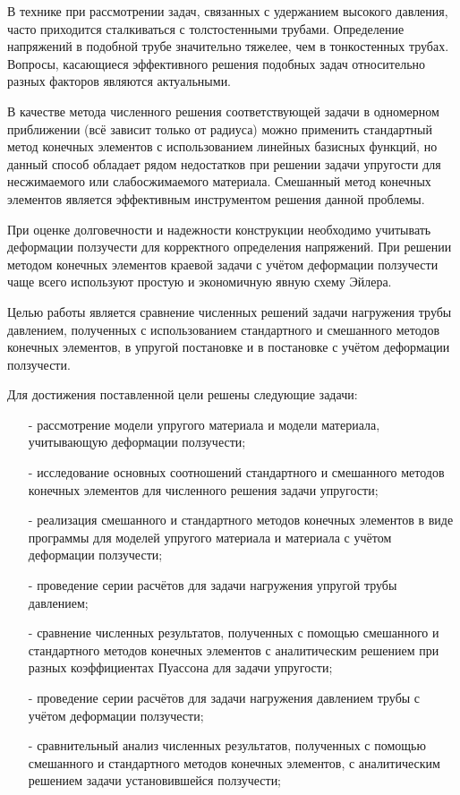 \documentclass[a4paper,14pt]{extarticle}
\begin{document}
В технике при рассмотрении задач, связанных с удержанием высокого давления, часто приходится сталкиваться с толстостенными трубами. Определение напряжений в подобной трубе значительно тяжелее, чем в тонкостенных трубах. Вопросы, касающиеся эффективного решения подобных задач относительно разных факторов являются актуальными. 

В качестве метода численного решения соответствующей задачи в одномерном приближении (всё зависит только от радиуса) можно применить стандартный метод конечных элементов с использованием линейных базисных функций, но данный способ обладает рядом недостатков при решении задачи упругости для несжимаемого или слабосжимаемого материала. Смешанный метод конечных элементов является эффективным инструментом решения данной проблемы. 

При оценке долговечности и надежности конструкции необходимо учитывать деформации ползучести для корректного определения напряжений. При решении методом конечных элементов краевой задачи с учётом деформации ползучести чаще всего используют простую и экономичную явную схему Эйлера.

Целью работы является сравнение численных решений задачи нагружения трубы давлением, полученных с использованием стандартного и смешанного методов конечных элементов, в упругой постановке и в постановке с учётом деформации ползучести.

Для достижения поставленной цели решены следующие задачи:
\begin{itemize}
\item[-]рассмотрение модели упругого материала и модели материала, учитывающую деформации ползучести;
\item[-]исследование основных соотношений стандартного и смешанного методов конечных элементов для численного решения задачи упругости;
\item[-]реализация смешанного и стандартного методов конечных элементов в виде программы для моделей упругого материала и материала с учётом деформации ползучести;
\item[-]проведение серии расчётов для задачи нагружения упругой трубы давлением;
\item[-]сравнение численных результатов, полученных с помощью смешанного и стандартного методов конечных элементов с аналитическим решением при разных коэффициентах Пуассона для задачи упругости;
\item[-]проведение серии расчётов для задачи нагружения давлением трубы с учётом деформации ползучести;
\item[-]сравнительный анализ численных результатов, полученных с помощью смешанного и стандартного методов конечных элементов, с аналитическим решением задачи установившейся ползучести;
\end{itemize}
\end{document}
